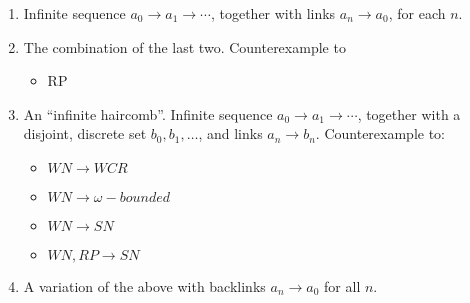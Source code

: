 \documentclass{article}
\begin{document}
\begin{enumerate}
  \item Infinite sequence $a_0 \to a_1 \to \cdots$, together with links
  $a_n \to a_0$, for each $n$.
  \item The combination of the last two.
  Counterexample to
  \begin{itemize}
    \item RP
  \end{itemize}
  \item An ``infinite haircomb''. Infinite sequence $a_0 \to a_1 \to \cdots$, together with
  a disjoint, discrete set $b_0, b_1, \dots$, and links $a_n \to b_n$.
  Counterexample to:
  \begin{itemize}
    \item $WN\to WCR$
    \item $WN\to \omega-bounded$
    \item $WN \to SN$
    \item $WN,RP \to SN$
  \end{itemize}
  \item A variation of the above with backlinks $a_n \to a_0$ for all $n$.
\end{enumerate}
\end{document}
